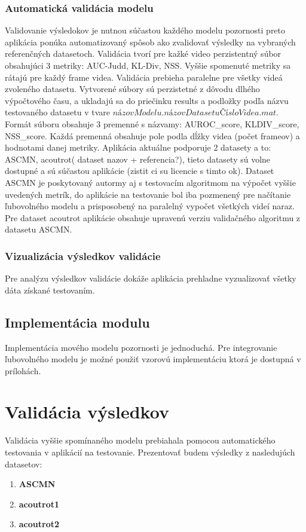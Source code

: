 \subsubsection{Automatická validácia modelu}
Validovanie výsledokov je nutnou súčastou každého modelu pozornosti preto aplikácia ponúka automatizovaný spôsob ako zvalidovať výsledky na vybraných referenčných datasetoch.
Validácia tvorí pre kažké video perzistentný súbor obsahujúci 3 metriky: AUC-Judd, KL-Div, NSS.
Vyššie spomenuté metriky sa rátajú pre každý frame videa.
Validácia prebieha paralelne pre všetky videá zvoleného datasetu.
Vytvorené súbory sú perzistetné z dôvodu dlhého výpočtového času, a ukladajú sa do priečinku results a podložky podľa názvu testovaného datasetu v tvare \begin{math}názovModelu.názovDatasetuČísloVidea.mat\end{math}.
Formát súboru obsahuje 3 premenné s názvamy: AUROC\_score, KLDIV\_score, NSS\_score.
Každá premenná obsahuje pole podla dĺžky videa (počet frameov) a hodnotami danej metriky.
Aplikácia aktuálne podporuje 2 datasety a to: ASCMN\cite{accv}, acoutrot( dataset nazov + referencia?), tieto datasety sú volne dostupné a sú súčastou aplikácie (zistit ci su licencie s timto ok).
Dataset ASCMN\cite{accv} je poskytovaný autormy aj s testovacím algoritmom na výpočet vyššie uvedených metrík, do aplikácie na testovanie bol iba pozmenený pre načítanie ľubovolného modelu a prisposobený na paralelný vypočet všetkých videí naraz.
Pre dataset acoutrot aplikácie obsahuje upravenú verziu validačného algoritmu z datasetu ASCMN.

\subsubsection{Vizualizácia výsledkov validácie}
Pre analýzu výsledkov validácie dokáže aplikácia prehladne vyzualizovať všetky dáta získané testovaním.

\subsection{Implementácia modulu}
Implementácia mového modelu pozornosti je jednoduchá.
Pre integrovanie ľubovolného modelu je možné použiť vzorovú implementáciu ktorá je dostupná v prílohách.

\section{Validácia výsledkov}
Validácia vyššie spomínaného modelu prebiahala pomocou automatického testovania v aplikácií na testovanie.
Prezentovať budem výsledky z nasledujúch datasetov:
\begin{enumerate}
  \item\textbf{ASCMN\cite{accv}}
  \item\textbf{acoutrot1\cite{coutrot-database}}
  \item\textbf{acoutrot2\cite{coutrot-database-2}}
\end{enumerate}

